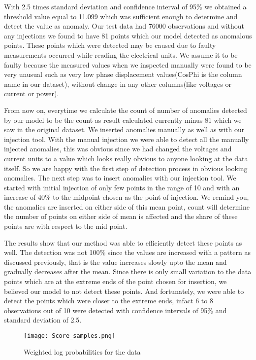 \begin{itemize}
With 2.5 times standard deviation and confidence interval of 95\% we obtained a threshold value equal to 11.099 which was sufficient enough to determine and detect the value as anomaly. Our test data had 76000 observations and without any injections we found to have 81 points which our model detected as anomalous points. These points which were detected may be caused due to faulty measurements occurred while reading the electrical units. We assume it to be faulty because the measured values when we inspected manually were found to be very unusual such as very low phase displacement values(CosPhi is the column name in our dataset), without change in any other columns(like voltages or current or power).

From now on, everytime we calculate the count of number of anomalies detected by our model to be the count as result calculated currently minus 81 which we saw in the original dataset. We inserted anomalies manually as well as with our injection tool. With the manual injection we were able to detect all the manually injected anomalies, this was obvious since we had changed the voltages and current units to a value which looks really obvious to anyone looking at the data itself. So we are happy with the first step of detection process in obvious looking anomalies. The next step was to insert anomalies with our injection tool. We started with initial injection of only few points in the range of 10 and with an increase of  40\% to the midpoint chosen as the point of injection. We remind you, the anomalies are inserted on either side of this mean point, count will determine the number of points on either side of mean is affected and the share of these points are with respect to the mid point.

The results show that our method was able to efficiently detect these points as well. The detection was not 100\% since the values are increased with a pattern as discussed previously, that is the value increases slowly upto the mean and gradually decreases after the mean. Since there is only small variation to the data points which are at the extreme ends of the point chosen for insertion, we believed our model to not detect these points. And fortunately, we were able to detect the points which were closer to the extreme ends, infact 6 to 8 observations out of 10 were detected with confidence intervals of 95\% and standard deviation of 2.5. 
\begin{figure}
\centerline{\texttt{[image: Score\_samples.png]}}
    \caption{Weighted log probabilities for the data}
    \label{fig:ss}
\end{figure}

\end{itemize}

\label{sec:Eval}

